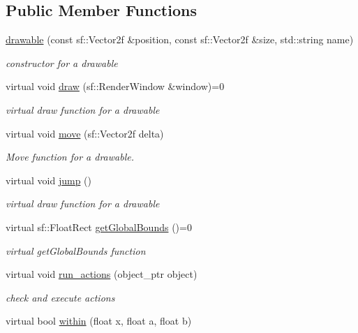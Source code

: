 \subsection*{Public Member Functions}
\begin{DoxyCompactItemize}
\item 
\hyperlink{classdrawable_a4e7881285581530d21b5c9fd59879b30}{drawable} (const sf\+::\+Vector2f \&position, const sf\+::\+Vector2f \&size, std\+::string name)
\begin{DoxyCompactList}\small\item\em constructor for a drawable \end{DoxyCompactList}\item 
virtual void \hyperlink{classdrawable_a4e49e2c1121704c83ce24c5f48dd910f}{draw} (sf\+::\+Render\+Window \&window)=0
\begin{DoxyCompactList}\small\item\em virtual draw function for a drawable \end{DoxyCompactList}\item 
virtual void \hyperlink{classdrawable_ad0d3930c045cc6776aa2c3965be32491}{move} (sf\+::\+Vector2f delta)
\begin{DoxyCompactList}\small\item\em Move function for a drawable. \end{DoxyCompactList}\item 
virtual void \hyperlink{classdrawable_ac39691470b7874f5dec59efe649d3981}{jump} ()
\begin{DoxyCompactList}\small\item\em virtual draw function for a drawable \end{DoxyCompactList}\item 
virtual sf\+::\+Float\+Rect \hyperlink{classdrawable_ae013ac0be47538be9ce885d6642daf73}{get\+Global\+Bounds} ()=0
\begin{DoxyCompactList}\small\item\em virtual get\+Global\+Bounds function \end{DoxyCompactList}\item 
virtual void \hyperlink{classdrawable_a715df01a318331e5611a2b0ad30109ff}{run\+\_\+actions} (object\+\_\+ptr object)
\begin{DoxyCompactList}\small\item\em check and execute actions \end{DoxyCompactList}\item 
virtual bool \hyperlink{classdrawable_a0d3278e4e888fc8289468e8893dd8329}{within} (float x, float a, float b)

\end{DoxyCompactItemize}
